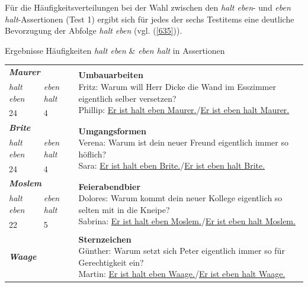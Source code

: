 Für die Häufigkeitsverteilungen bei der Wahl zwischen den \textit{halt eben}- und \textit{eben halt}-Assertionen (Test 1) ergibt sich für jedes der sechs Testitems eine deutliche Bevorzugung der Abfolge \textit{halt eben} (vgl. (\ref{635})).
\pagebreak
\begin{exe}
\renewcommand{\arraystretch}{1.75}
\ex\label{635} Ergebnisse Häufigkeiten \emph{halt eben} \& \emph{eben halt} in Assertionen\\[-0.6em]
\scriptsize
\begin{tabular}[t]{|l|l|p{25em}|}
\hline 
\multicolumn{2}{|l|}{\textbf{\textit{Maurer}}}& \multirow{3}{25em}{\textbf{Umbauarbeiten}\newline Fritz: Warum will Herr Dicke die Wand im Esszimmer eigentlich selber versetzen?\newline Phillip:  \underline{Er ist halt eben Maurer.}/\underline{Er ist eben halt Maurer.}}\\
\cline{1-2}
\emph{halt eben}& \emph{eben halt} & {}\\
\cline{1-2}
24 & 4 & {}\\
\hline
\multicolumn{2}{|l|}{\textbf{\textit{Brite}}}& \multirow{3}{25em}{\textbf{Umgangsformen}\newline Verena: Warum ist dein neuer Freund eigentlich immer so höflich?\newline Sara: \underline{Er ist halt eben Brite.}/\underline{Er ist eben halt Brite.}}\\
\cline{1-2}
\emph{halt eben}& \emph{eben halt} & {}\\
\cline{1-2}
24 & 4 & {}\\
\hline
\multicolumn{2}{|l|}{\textbf{\textit{Moslem}}}& \multirow{3}{25em}{\textbf{Feierabendbier
}\newline Dolores: Warum kommt dein neuer Kollege eigentlich so selten mit in die Kneipe?\newline Sabrina: \underline{Er ist halt eben Moslem.}/\underline{Er ist eben halt Moslem.}}\\
\cline{1-2}
\emph{halt eben}& \emph{eben halt} & {}\\
\cline{1-2}
22 & 5 & {}\\
\hline
\multicolumn{2}{|l|}{\textbf{\textit{Waage}}}& \multirow{3}{25em}{\textbf{Sternzeichen}\newline Günther: Warum setzt sich Peter eigentlich immer so für Gerechtigkeit ein? \newline
Martin: \underline{Er ist halt eben Waage.}/\underline{Er ist eben halt Waage.}}\\

\end{tabular}
\end{exe}
